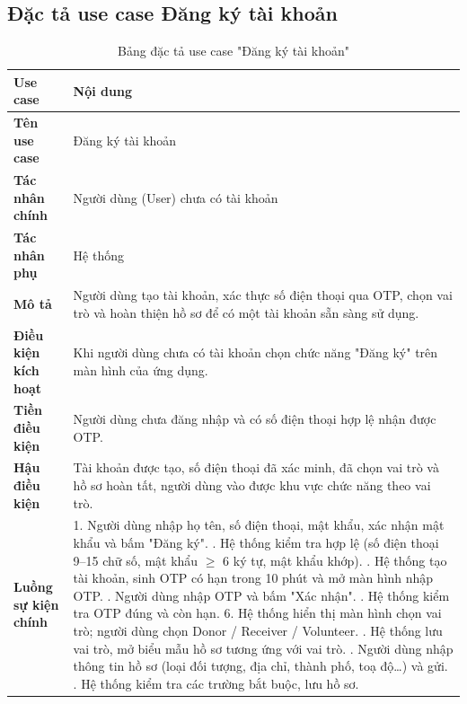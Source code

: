 \documentclass[../main.tex]{subfiles}%
\begin{document}
\subsection{ Đặc tả use case Đăng ký tài khoản}
\label{section:2.4.4}

\begingroup
\renewcommand{\arraystretch}{1.5}
\begin{longtable}{|p{3.5cm}|p{11.5cm}|}
\caption{Bảng đặc tả use case "Đăng ký tài khoản"}
\label{tab:usecase_dang_ky_tai_khoan}\\
\hline
\textbf{Use case} & \textbf{Nội dung} \\ \hline
\textbf{Tên use case} & Đăng ký tài khoản \\ \hline
\textbf{Tác nhân chính} & Người dùng (User) chưa có tài khoản \\ \hline
\textbf{Tác nhân phụ} & Hệ thống \\ \hline
\textbf{Mô tả} & Người dùng tạo tài khoản, xác thực số điện thoại qua OTP, chọn vai trò và hoàn thiện hồ sơ để có một tài khoản sẵn sàng sử dụng. \\ \hline
\textbf{Điều kiện kích hoạt} & Khi người dùng chưa có tài khoản chọn chức năng "Đăng ký" trên màn hình của ứng dụng. \\ \hline
\textbf{Tiền điều kiện} & Người dùng chưa đăng nhập và có số điện thoại hợp lệ nhận được OTP. \\ \hline
\textbf{Hậu điều kiện} & Tài khoản được tạo, số điện thoại đã xác minh, đã chọn vai trò và hồ sơ hoàn tất, người dùng vào được khu vực chức năng theo vai trò. \\ \hline
\textbf{Luồng sự kiện chính} &
1. Người dùng nhập họ tên, số điện thoại, mật khẩu, xác nhận mật khẩu và bấm "Đăng ký". \newline
2. Hệ thống kiểm tra hợp lệ (số điện thoại 9–15 chữ số, mật khẩu $\ge$ 6 ký tự, mật khẩu khớp). \newline
3. Hệ thống tạo tài khoản, sinh OTP có hạn trong 10 phút và mở màn hình nhập OTP. \newline
4. Người dùng nhập OTP và bấm "Xác nhận". \newline
5. Hệ thống kiểm tra OTP đúng và còn hạn.
6. Hệ thống hiển thị màn hình chọn vai trò; người dùng chọn Donor / Receiver / Volunteer. \newline
7. Hệ thống lưu vai trò, mở biểu mẫu hồ sơ tương ứng với vai trò. \newline
8. Người dùng nhập thông tin hồ sơ (loại đối tượng, địa chỉ, thành phố, toạ độ…) và gửi. \newline
9. Hệ thống kiểm tra các trường bắt buộc, lưu hồ sơ. \newline

\end{longtable}
\end{document}

